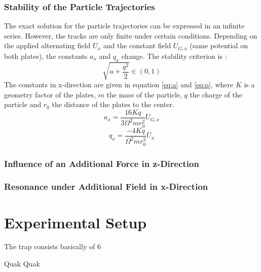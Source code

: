 \documentclass[
	paper=A4,
	parskip=full,
	chapterprefix=true,
	11pt,
	headings=normal,
	bibliography=totoc,
	listof=totoc,
	titlepage=on,
]{scrreprt}
\begin{document}
\subsection{Stability of the Particle Trajectories}
The exact solution for the particle trajectories can be expressed in an infinite series. However, the tracks are only finite under certain conditions. Depending on the applied alternating field $U_x$ and the constant field $U_{G,x}$ (same potential on both plates), the constants $a_x$ and $q_x$ change. The stability criterion is \cite{Lab_manual}:
\begin{equation}
\sqrt{a+\frac{q^2}{2}} \in (0,1)
\end{equation}
The constants in x-direction are given in equation \ref{eq:a} and \ref{eq:q}, where $K$ is a geometry factor of the plates, $m$ the mass of the particle, $q$ the charge of the particle and $r_0$ the distance of the plates to the center.
\begin{equation}
\label{eq:a}
a_x=\frac{16 K q}{3 \Omega^2 m r_0^2} U_{G,x}
\end{equation}
\begin{equation}
\label{eq:q}
q_x= \frac{-4 K q}{ \Omega^2 m r_0^2} U_{x}
\end{equation}


\subsection{Influence of an Additional Force in z-Direction}
\subsection{Resonance under Additional Field in x-Direction}




\chapter{Experimental Setup}
The trap consists basically of 6 


Quak Quak
\end{document}
